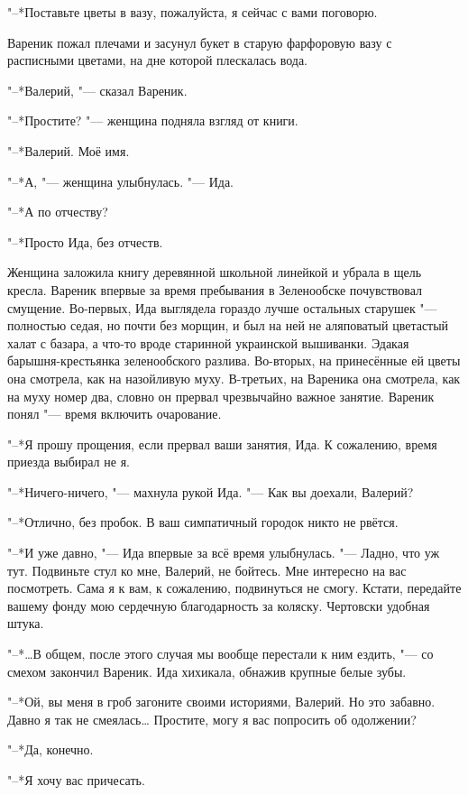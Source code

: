 "--*Поставьте цветы в вазу, пожалуйста, я сейчас с вами поговорю.

Вареник пожал плечами и засунул букет в старую фарфоровую вазу с расписными цветами, на дне которой плескалась вода.

"--*Валерий, "--- сказал Вареник.

"--*Простите? "--- женщина подняла взгляд от книги.

"--*Валерий.
Моё имя.

"--*А, "--- женщина улыбнулась.
"--- Ида.

"--*А по отчеству?

"--*Просто Ида, без отчеств.

Женщина заложила книгу деревянной школьной линейкой и убрала в щель кресла.
Вареник впервые за время пребывания в Зеленообске почувствовал смущение.
Во-первых, Ида выглядела гораздо лучше остальных старушек "--- полностью седая, но почти без морщин, и был на ней не аляповатый цветастый халат с базара, а что-то вроде старинной украинской вышиванки.
Эдакая барышня-крестьянка зеленообского разлива.
Во-вторых, на принесённые ей цветы она смотрела, как на назойливую муху.
В-третьих, на Вареника она смотрела, как на муху номер два, словно он прервал чрезвычайно важное занятие.
Вареник понял "--- время включить очарование.

"--*Я прошу прощения, если прервал ваши занятия, Ида.
К сожалению, время приезда выбирал не я.

"--*Ничего-ничего, "--- махнула рукой Ида.
"--- Как вы доехали, Валерий?

"--*Отлично, без пробок.
В ваш симпатичный городок никто не рвётся.

"--*И уже давно, "--- Ида впервые за всё время улыбнулась.
"--- Ладно, что уж тут.
Подвиньте стул ко мне, Валерий, не бойтесь.
Мне интересно на вас посмотреть.
Сама я к вам, к сожалению, подвинуться не смогу.
Кстати, передайте вашему фонду мою сердечную благодарность за коляску.
Чертовски удобная штука.

\asterism

"--*\ldots{}В общем, после этого случая мы вообще перестали к ним ездить, "--- со смехом закончил Вареник.
Ида хихикала, обнажив крупные белые зубы.

"--*Ой, вы меня в гроб загоните своими историями, Валерий.
Но это забавно.
Давно я так не смеялась\ldots{}
Простите, могу я вас попросить об одолжении?

"--*Да, конечно.

"--*Я хочу вас причесать.

